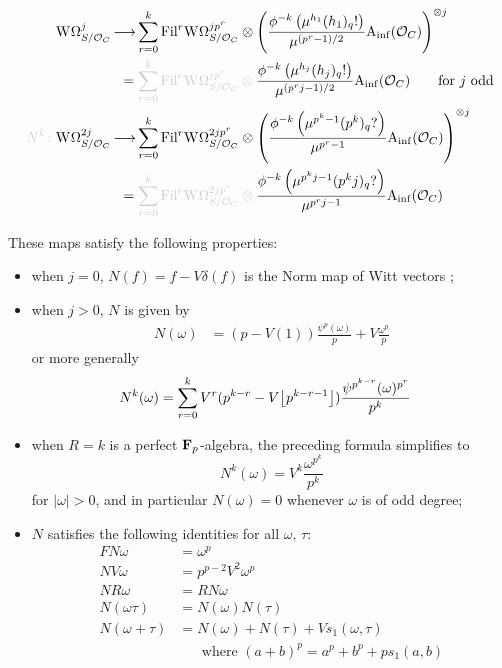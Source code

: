 \begin{theorem}
\begin{align*}
    \dRW^{j}_{S/\O_C}
    &\morph
    \sum_{r=0}^k
    \Fil^r \dRW^{jp^r}_{S/\O_C} \tnsr \left(\frac{\phi^{-k}\left(\mu^{h_1} (h_1)_q!\right)}{\mu^{(p^r-1)/2}}\Ainf(\O_C)\right)^{\tnsr j}\\
    &\hspace{.6em}=\fade{\sum_{r=0}^k
    \Fil^r \dRW^{jp^r}_{S/\O_C} \tnsr{}} \frac{\phi^{-k}\left(\mu^{h_j} (h_j)_q!\right)}{\mu^{(p^rj-1)/2}}\Ainf(\O_C) \qquad\text{\normalfont for $j$ odd}\\
    \fade{N^k \colon}
    \dRW^{2j}_{S/\O_C}
    &\morph
    \sum_{r=0}^k
    \Fil^r \dRW^{2jp^r}_{S/\O_C} \tnsr \left(\frac{\phi^{-k}\left(\mu^{p^k-1} (p^k)_q?\right)}{\mu^{p^r-1}}\Ainf(\O_C)\right)^{\tnsr j}\\
    &\hspace{.6em}=\fade{
    \sum_{r=0}^k
  \Fil^r \dRW^{2jp^r}_{S/\O_C} \tnsr{}} \frac{\phi^{-k}\left(\mu^{p^kj-1} (p^k j)_q?\right)}{\mu^{p^rj-1}}\Ainf(\O_C)
  \end{align*}

  These maps satisfy the following properties:
  \begin{itemize}
    \item when $j=0$, $N(f)=f - V\delta(f)$ is the Norm map of Witt vectors \cite{AngeltveitNorm};

    \item when $j>0$, $N$ is given by 
      \begin{align*}
        N(\omega)
          &= (p-V(1))\frac{\psi^p(\omega)}p + V\frac{\omega^p}p
      \end{align*}
      or more generally
      \begin{align*}
        N^k(\omega)
          &= \sum_{r=0}^k V^r(p^{k-r} - V{\left\lfloor p^{k-r-1}\right\rfloor})\frac{\psi^{p^{k-r}}(\omega)^{p^{r}}}{p^k}
      \end{align*}

    \item when $R=k$ is a perfect $\mathbf F_p$-algebra, the preceding formula simplifies to
      \[ N^k(\omega) = V^k \frac{\omega^{p^k}}{p^k} \]
      for $|\omega|>0$, and in particular $N(\omega)=0$ whenever $\omega$ is of odd degree;

    \item $N$ satisfies the following identities for all $\omega,\,\tau$:
      \begin{align*}
        FN\omega &= \omega^p\\
        NV\omega &= p^{p-2}V^2\omega^p\\
        NR\omega &= RN\omega\\
        N(\omega\tau) &= N(\omega)N(\tau)\\
        N(\omega+\tau) &= N(\omega)+N(\tau)+Vs_1(\omega, \tau)\\
                       &\phantom{={}}\text{ where } (a+b)^p = a^p + b^p + ps_1(a, b)
      \end{align*}
  \end{itemize}
\end{theorem}

